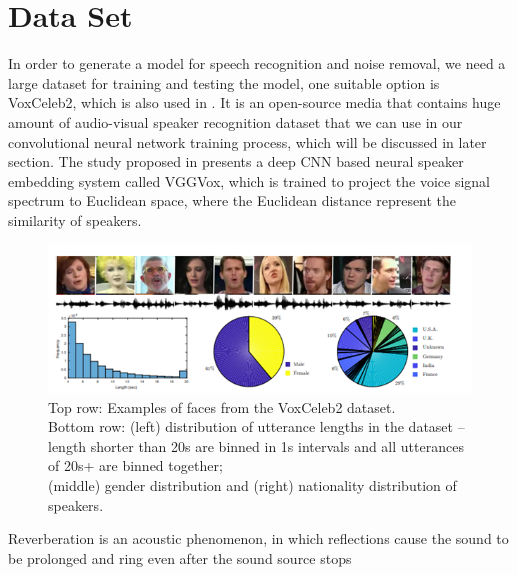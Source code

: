 \documentclass[runningheads,a4paper]{llncs}
\begin{document}
\section{Data Set}
In order to generate a model for speech recognition and noise removal, we need a large dataset for training and testing the model, one suitable option is VoxCeleb2, which is also used in \cite{7}. It is an open-source media that contains huge amount of audio-visual speaker recognition dataset that we can use in our convolutional neural network training process, which will be discussed in later section. The study proposed in \cite{7} presents a deep CNN based neural speaker embedding system called VGGVox, which is trained to project the voice signal spectrum to Euclidean space, where the Euclidean distance represent the similarity of speakers.\\

\begin{figure}[H]
\includegraphics[scale=0.6]{figure3.png}
\caption{Top row: Examples of faces from the VoxCeleb2 dataset.\\Bottom row: (left) distribution of utterance lengths in the dataset – length shorter than 20s are binned in 1s intervals and all utterances of 20s+ are binned together; \\(middle) gender distribution and (right) nationality distribution of speakers. \cite{7}}
\label{fig:framework}
\end{figure}



Reverberation is an acoustic phenomenon, in which reflections cause the sound to be prolonged and ring even after the sound source stops
\end{document}
